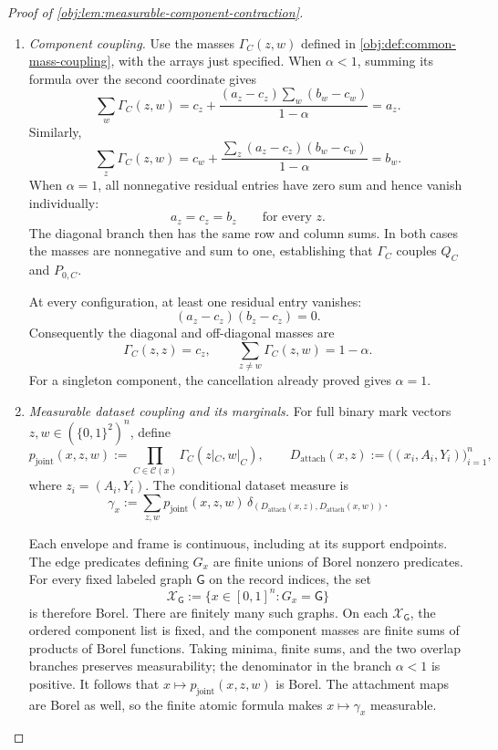 \begin{proof}[Proof of \cref{obj:lem:measurable-component-contraction}]
\begin{enumerate}
\item \textit{Component coupling.}
Use the masses \(\Gamma_C(z,w)\) defined in
\cref{obj:def:common-mass-coupling}, with the arrays just specified. When \(\alpha<1\), summing its formula over the second coordinate gives
\[
\sum_w\Gamma_C(z,w)
=
c_z+\frac{(a_z-c_z)\sum_w(b_w-c_w)}{1-\alpha}
=a_z.
\]
Similarly,
\[
\sum_z\Gamma_C(z,w)
=
c_w+\frac{\sum_z(a_z-c_z)(b_w-c_w)}{1-\alpha}
=b_w.
\]
When \(\alpha=1\), all nonnegative residual entries have zero sum and hence vanish individually:
\[
a_z=c_z=b_z
\qquad\text{for every }z.
\]
The diagonal branch then has the same row and column sums. In both cases the masses are nonnegative and sum to one, establishing that \(\Gamma_C\) couples \(Q_C\) and \(P_{0,C}\).

At every configuration, at least one residual entry vanishes:
\[
(a_z-c_z)(b_z-c_z)=0.
\]
Consequently the diagonal and off-diagonal masses are
\[
\Gamma_C(z,z)=c_z,
\qquad
\sum_{z\ne w}\Gamma_C(z,w)=1-\alpha.
\]
For a singleton component, the cancellation already proved gives \(\alpha=1\).

\item \textit{Measurable dataset coupling and its marginals.}
For full binary mark vectors \(z,w\in(\{0,1\}^2)^n\), define
\[
p_{\mathrm{joint}}(x,z,w)
:=
\prod_{C\in\mathscr C(x)}
 \Gamma_C(z|_C,w|_C),
\qquad
D_{\mathrm{attach}}(x,z)
:=
\bigl((x_i,A_i,Y_i)\bigr)_{i=1}^n,
\]
where \(z_i=(A_i,Y_i)\). The conditional dataset measure is
\[
\gamma_x
:=
\sum_{z,w}p_{\mathrm{joint}}(x,z,w)\,
\delta_{\left(D_{\mathrm{attach}}(x,z),
               D_{\mathrm{attach}}(x,w)\right)}.
\]

Each envelope and frame is continuous, including at its support endpoints. The edge predicates defining \(G_x\) are finite unions of Borel nonzero predicates. For every fixed labeled graph \(\mathsf G\) on the record indices, the set
\[
\mathcal X_{\mathsf G}:=\{x\in[0,1]^n:G_x=\mathsf G\}
\]
is therefore Borel. There are finitely many such graphs. On each \(\mathcal X_{\mathsf G}\), the ordered component list is fixed, and the component masses are finite sums of products of Borel functions. Taking minima, finite sums, and the two overlap branches preserves measurability; the denominator in the branch \(\alpha<1\) is positive. It follows that \(x\mapsto p_{\mathrm{joint}}(x,z,w)\) is Borel. The attachment maps are Borel as well, so the finite atomic formula makes \(x\mapsto\gamma_x\) measurable.


\end{enumerate}
\end{proof}
